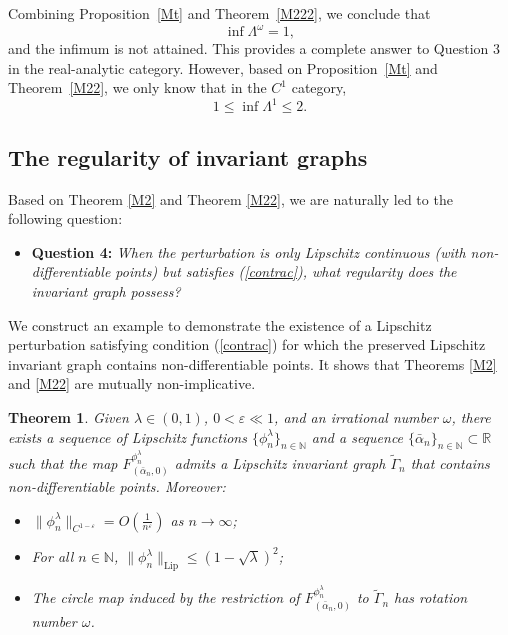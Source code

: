 \documentclass{amsart}
\newtheorem{Theorem}{Theorem}
\theoremstyle{definition}
\begin{document}
Combining Proposition~\ref{Mt} and Theorem~\ref{M222}, we conclude that
\[
\inf \Lambda^\omega = 1,
\]
and the infimum is not attained. This provides a complete answer to Question 3 in the real-analytic category. However, based on Proposition~\ref{Mt} and Theorem~\ref{M22}, we only know that in the $C^1$ category,
\[
1 \leq \inf  \Lambda^1 \leq 2.
\]


\subsection{The regularity of invariant graphs}


Based on Theorem \ref{M2} and Theorem \ref{M22}, we are naturally led to the following question:

\vspace{1ex}

\begin{itemize}
\item \textbf{Question 4:} {\it When the perturbation is only Lipschitz continuous (with non-differentiable points) but satisfies (\ref{contrac}), what regularity does the invariant graph possess?}
\end{itemize}

\vspace{1ex}



We construct an example to demonstrate the existence of a Lipschitz perturbation satisfying condition (\ref{contrac}) for which the preserved Lipschitz invariant graph contains non-differentiable points. It shows that Theorems \ref{M2} and \ref{M22} are mutually non-implicative.
\begin{Theorem}\label{M3}
Given $\lambda \in (0,1)$, $0 < \varepsilon \ll 1$, and an irrational number $\omega$, there exists a sequence of Lipschitz functions $\{\phi_n^{\lambda}\}_{n \in \mathbb{N}}$ and a sequence $\{\bar{\alpha}_n\}_{n \in \mathbb{N}} \subset \mathbb{R}$ such that the map $F^{\phi_n^\lambda}_{(\bar{\alpha}_n,0)}$ admits a Lipschitz invariant graph $\tilde{\Gamma}_n$ that contains non-differentiable points. Moreover:
\begin{itemize}
    \item[(I)] $\|\phi^{\lambda}_n\|_{C^{1-\varepsilon}} = O\left(\frac{1}{n^\varepsilon}\right)$ as $n \to \infty$;
    \item[(II)] For all $n \in \mathbb{N}$, $\|\phi^{\lambda}_n\|_{\mathrm{Lip}} \leq (1 - \sqrt{\lambda})^2$;
    \item[(III)] The circle map induced by the restriction of $F^{\phi_n^\lambda}_{(\bar{\alpha}_n,0)}$ to $\tilde{\Gamma}_n$ has rotation number $\omega$.
\end{itemize}

\end{Theorem}
\end{document}
